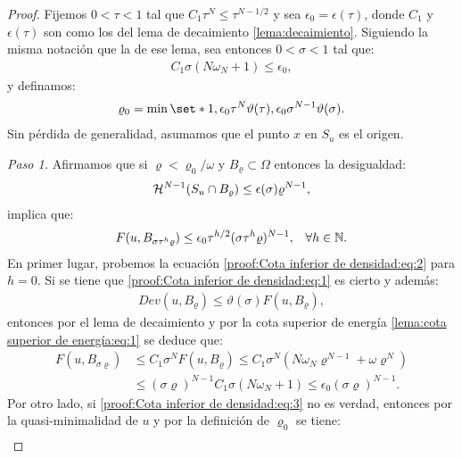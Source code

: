 \documentclass[a4paper,11pt,spanish, twoside, leqno]{tfm-uam}
\begin{document}
\begin{proof}
Fijemos $0<\tau<1$ tal que $C_{1}\tau^{N}\leq \tau^{N-1/2}$ y sea $\epsilon_{0}=\epsilon(\tau)$, donde $C_{1}$ y $\epsilon(\tau)$ son como los del lema de decaimiento \ref{lema:decaimiento}. Siguiendo la misma notación que la de ese lema, sea entonces $0<\sigma<1$ tal que:
\begin{align*}
C_{1}\sigma (N\omega_{N}+1)\leq \epsilon_{0},
\end{align*}
y definamos:
\begin{align*}
\varrho_{0}=\min \set*{1, \epsilon_{0}\tau^{N}\vartheta(\tau), \epsilon_{0}\sigma^{N-1}\vartheta(\sigma)}.
\end{align*}
Sin pérdida de generalidad, asumamos que el punto $x$ en $S_{u}$ es el origen.

\textit{Paso 1.} Afirmamos que si $\varrho<\varrho_{0}/\omega$ y $B_{\varrho}\subset \Omega$ entonces la desigualdad:
\begin{align}\label{proof:Cota inferior de densidad:eq:1}
\mathcal{H}^{N-1}(S_{u}\cap B_{\varrho})\leq \epsilon(\sigma)\varrho^{N-1},
\end{align}
implica que:
\begin{align}\label{proof:Cota inferior de densidad:eq:2}
\begin{array}{ll}
\displaystyle
F(u,B_{\sigma\tau^{h}\varrho})\leq \epsilon_{0}\tau^{h/2}(\sigma\tau^{h}\varrho)^{N-1}, & \forall h\in \mathbb{N}.
\end{array}
\end{align}
En primer lugar, probemos la ecuación \ref{proof:Cota inferior de densidad:eq:2} para $h=0$. Si se tiene que \ref{proof:Cota inferior de densidad:eq:1} es cierto y además:
\begin{align}\label{proof:Cota inferior de densidad:eq:3}
Dev(u,B_{\varrho})\leq \vartheta(\sigma)F(u, B_{\varrho}),
\end{align}
entonces por el lema de decaimiento y por la cota superior de energía \ref{lema:cota superior de energía:eq:1} se deduce que:
\begin{align*}
F(u,B_{\sigma\varrho})&\leq C_{1}\sigma^{N}F(u, B_{\varrho})\leq C_{1}\sigma^{N}(N\omega_{N}\varrho^{N-1}+\omega\varrho^{N})\\
&\leq (\sigma\varrho)^{N-1}C_{1}\sigma (N\omega_{N}+1)\leq \epsilon_{0}(\sigma\varrho)^{N-1}.
\end{align*}
Por otro lado, si \ref{proof:Cota inferior de densidad:eq:3} no es verdad, entonces por la quasi-minimalidad de $u$ y por la definición de $\varrho_{0}$ se tiene:
\begin{align*}

\end{align*}
\end{proof}
\end{document}

